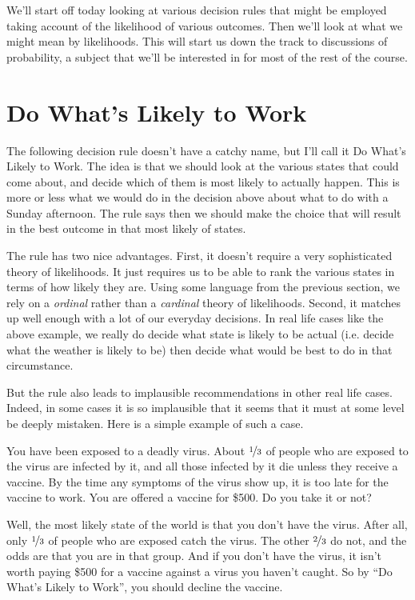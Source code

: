 We'll start off today looking at various decision rules that might be employed taking account of the likelihood of various outcomes. Then we'll look at what we might mean by likelihoods. This will start us down the track to discussions of probability, a subject that we'll be interested in for most of the rest of the course.

\section{Do What's Likely to Work}
The following decision rule doesn't have a catchy name, but I'll call it Do What's Likely to Work. The idea is that we should look at the various states that could come about, and decide which of them is most likely to actually happen. This is more or less what we would do in the decision above about what to do with a Sunday afternoon. The rule says then we should make the choice that will result in the best outcome in that most likely of states.

The rule has two nice advantages. First, it doesn't require a very sophisticated theory of likelihoods. It just requires us to be able to rank the various states in terms of how likely they are. Using some language from the previous section, we rely on a \textit{ordinal} rather than a \textit{cardinal} theory of likelihoods. Second, it matches up well enough with a lot of our everyday decisions. In real life cases like the above example, we really do decide what state is likely to be actual (i.e. decide what the weather is likely to be) then decide what would be best to do in that circumstance.

But the rule also leads to implausible recommendations in other real life cases. Indeed, in some cases it is so implausible that it seems that it must at some level be deeply mistaken. Here is a simple example of such a case.

You have been exposed to a deadly virus. About $\nicefrac{1}{3}$ of people who are exposed to the virus are infected by it, and all those infected by it die unless they receive a vaccine. By the time any symptoms of the virus show up, it is too late for the vaccine to work. You are offered a vaccine for \$500. Do you take it or not?

Well, the most likely state of the world is that you don't have the virus. After all, only $\nicefrac{1}{3}$ of people who are exposed catch the virus. The other $\nicefrac{2}{3}$ do not, and the odds are that you are in that group. And if you don't have the virus, it isn't worth paying \$500 for a vaccine against a virus you haven't caught. So by ``Do What's Likely to Work'', you should decline the vaccine.

